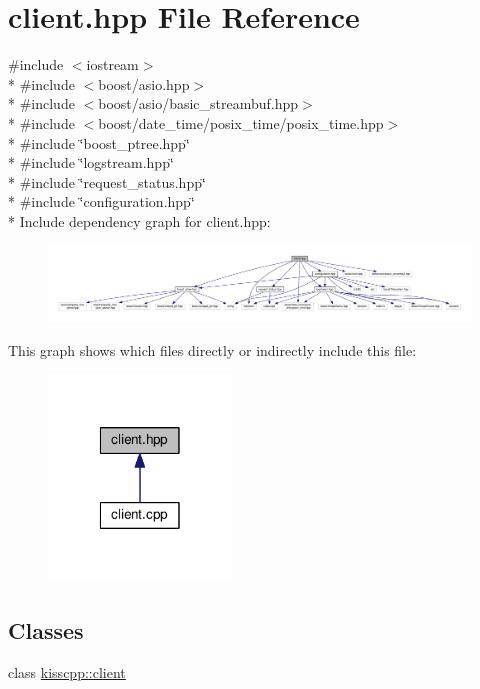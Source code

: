 \hypertarget{a00050}{\section{client.\-hpp File Reference}
\label{a00050}
}
{\ttfamily \#include $<$iostream$>$}\\*
{\ttfamily \#include $<$boost/asio.\-hpp$>$}\\*
{\ttfamily \#include $<$boost/asio/basic\-\_\-streambuf.\-hpp$>$}\\*
{\ttfamily \#include $<$boost/date\-\_\-time/posix\-\_\-time/posix\-\_\-time.\-hpp$>$}\\*
{\ttfamily \#include \char`\"{}boost\-\_\-ptree.\-hpp\char`\"{}}\\*
{\ttfamily \#include \char`\"{}logstream.\-hpp\char`\"{}}\\*
{\ttfamily \#include \char`\"{}request\-\_\-status.\-hpp\char`\"{}}\\*
{\ttfamily \#include \char`\"{}configuration.\-hpp\char`\"{}}\\*
Include dependency graph for client.\-hpp\-:\nopagebreak
\begin{figure}[H]
\begin{center}
\leavevmode
\includegraphics[width=350pt]{a00096}
\end{center}
\end{figure}
This graph shows which files directly or indirectly include this file\-:\nopagebreak
\begin{figure}[H]
\begin{center}
\leavevmode
\includegraphics[width=138pt]{a00097}
\end{center}
\end{figure}
\subsection*{Classes}
\begin{DoxyCompactItemize}
\item 
class \hyperlink{a00020}{kisscpp\-::client}
\end{DoxyCompactItemize}
